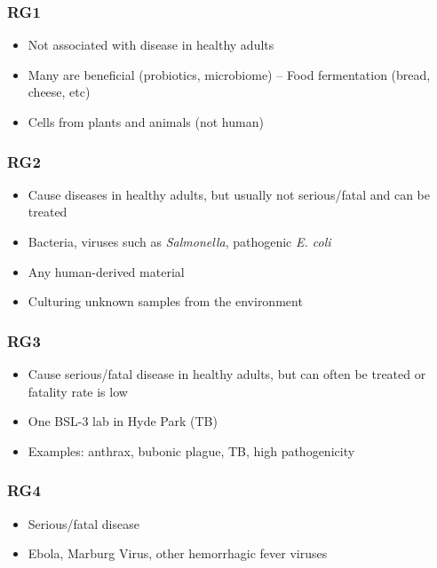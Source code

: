 \documentclass[letterpaper, 12pt]{article}
\begin{document}
\subsubsection*{RG1}

\begin{itemize}
\item Not associated with disease in healthy adults
\item Many are beneficial (probiotics, microbiome) -- Food fermentation (bread, cheese, etc)
\item Cells from plants and animals (not human)
\end{itemize}

\subsubsection*{RG2}

\begin{itemize}
\item Cause diseases in healthy adults, but usually not serious/fatal and can be treated
\item Bacteria, viruses such as \textit{Salmonella}, pathogenic \textit{E. coli}
\item Any human-derived material
\item Culturing unknown samples from the environment
\end{itemize}

\subsubsection*{RG3}

\begin{itemize}
\item Cause serious/fatal disease in healthy adults, but can often be treated or fatality rate is low
\item One BSL-3 lab in Hyde Park (TB)
\item Examples: anthrax, bubonic plague, TB, high pathogenicity
\end{itemize}

\subsubsection*{RG4}

\begin{itemize}
\item Serious/fatal disease
\item Ebola, Marburg Virus, other hemorrhagic fever viruses
\end{itemize}
\end{document}
